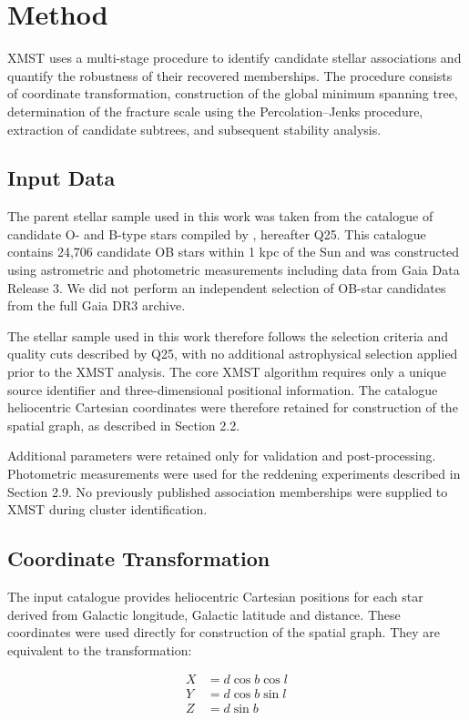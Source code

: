 \documentclass[fleqn,usenatbib]{mnras}
\begin{document}
\section{Method}


XMST uses a multi-stage procedure to identify candidate stellar associations and quantify the robustness of their recovered memberships. The procedure consists of coordinate transformation, construction of the global minimum spanning tree, determination of the fracture scale using the Percolation–Jenks procedure, extraction of candidate subtrees, and subsequent stability analysis.

\subsection{Input Data}
The parent stellar sample used in this work was taken from the catalogue of candidate O- and B-type stars compiled by \cite{Quintana2025}, hereafter Q25. This catalogue contains 24,706 candidate OB stars within 1 kpc of the Sun and was constructed using astrometric and photometric measurements including data from Gaia Data Release 3. We did not perform an independent selection of OB-star candidates from the full Gaia DR3 archive.

The stellar sample used in this work therefore follows the selection criteria and quality cuts described by Q25, with no additional astrophysical selection applied prior to the XMST analysis. The core XMST algorithm requires only a unique source identifier and three-dimensional positional information. The catalogue heliocentric Cartesian coordinates were therefore retained for construction of the spatial graph, as described in Section 2.2.

Additional parameters were retained only for validation and post-processing. Photometric measurements were used for the reddening experiments described in Section 2.9. No previously published association memberships were supplied to XMST during cluster identification.

\subsection{Coordinate Transformation}
The input catalogue provides heliocentric Cartesian positions for each star derived from Galactic longitude, Galactic latitude and distance. These coordinates were used directly for construction of the spatial graph. They are equivalent to the transformation:

\begin{align}
X &= d \cos b \cos l \\
Y &= d \cos b \sin l \\
Z &= d \sin b
\end{align}
\end{document}

